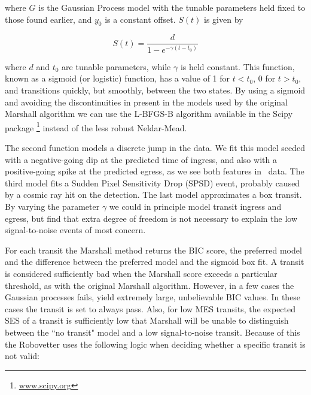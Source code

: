 \noindent
where $G$ is the Gaussian Process model with the tunable parameters held fixed to those found earlier, and $y_0$ is a constant offset. $S(t)$ is given by

\begin{equation}
S(t) = \frac{d}{1 - e^{-\gamma (t-t_0)} }
\end{equation}

\noindent
where $d$ and $t_0$ are tunable parameters, while $\gamma$ is held constant. This function, known as a sigmoid (or logistic) function, has a value of 1 for $t<t_0$, 0 for $t>t_0$, and transitions quickly, but smoothly, between the two states. By using a sigmoid and avoiding the discontinuities in present in the models used by the original Marshall algorithm we can use the L-BFGS-B algorithm \citep{Byrd95} available in the Scipy package \footnote{\url{www.scipy.org}} instead of the less robust Neldar-Mead.

The second function models a discrete jump in the data. We fit this model seeded with a negative-going dip at the predicted time of ingress, and also with a positive-going spike at the predicted egress, as we see both features in \Kepler\ data. The third model fits a Sudden Pixel Sensitivity Drop (SPSD) event, probably caused by a cosmic ray hit on the detection. The last model approximates a box transit. By varying the parameter $\gamma$ we could in principle model transit ingress and egress, but find that extra degree of freedom is not necessary to explain the low signal-to-noise events of most concern.

For each transit the Marshall method returns the BIC score, the preferred model and the difference between the preferred model and the sigmoid box fit.  A transit is considered sufficiently bad when the Marshall score exceeds a particular threshold, as with the original Marshall algorithm.  However, in a few cases the Gaussian processes fails, yield extremely large, unbelievable BIC values. In these cases the transit is set to always pass.  Also, for low MES transits, the expected SES of a transit is sufficiently low that Marshall will be unable to distinguish between the ``no transit" model and a low signal-to-noise transit.  Because of this the Robovetter uses the following logic when deciding whether a specific transit is not valid:



